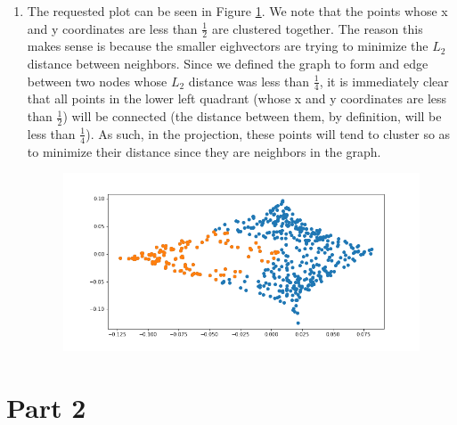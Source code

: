 \documentclass[12pt]{article}
\begin{document}
\begin{enumerate}[label=(\alph*)]
    \item 
      The requested plot can be seen in Figure \ref{fig:random_projection}. We note that the points whose x and y coordinates are less than $\frac{1}{2}$ are clustered together. The reason this makes sense is because the smaller eighvectors are trying to minimize the $L_2$ distance between neighbors. Since we defined the graph to form and edge between two nodes whose $L_2$ distance was less than $\frac{1}{4}$, it is immediately clear that all points in the lower left quadrant (whose x and y coordinates are less than $\frac{1}{2}$) will be connected (the distance between them, by definition, will be less than $\frac{1}{4}$). As such, in the projection, these points will tend to cluster so as to minimize their distance since they are neighbors in the graph.

      \begin{figure}[!ht]
        \centering
        \includegraphics[scale=0.5]{figures/cluster_random.png}
        \label{Projection onto second and third smallest eigenvectors of random graph where connectivity is defined by L2 distance less than 0.25.}
        \label{fig:random_projection}
      \end{figure}

\end{enumerate}

\section*{Part 2}
\end{document}
